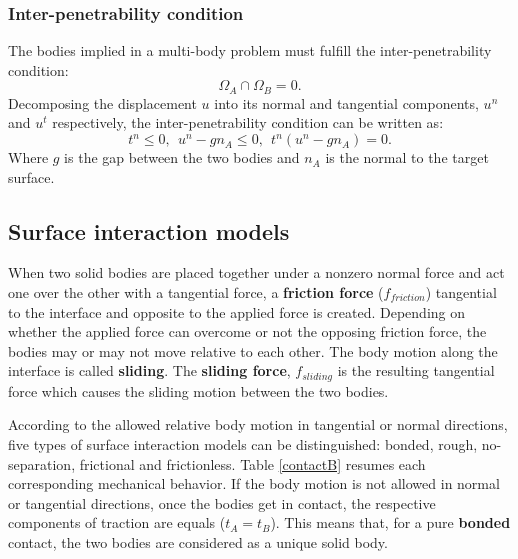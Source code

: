  \subsubsection*{Inter-penetrability condition}
The bodies implied in a multi-body problem must fulfill the inter-penetrability condition:
\begin{equation}
\Omega_A \cap \Omega_B = 0.
\end{equation}
Decomposing the displacement $u$ into its normal and tangential components, $u^n$ and $u^t$ respectively, the inter-penetrability condition can be written as:
\begin{equation}
t^n \leq 0, \ \ u^n-g n_A \leq 0, \ \ t^n(u^n-g n_A) = 0.
\end{equation}
 Where $g$ is the gap between the two bodies and $n_A$ is the normal to the target surface.

\subsection{Surface interaction models}%

\label{subsection:surfaceinteractionmodels}
When two solid bodies are placed together under a nonzero normal force and act one over the other with a tangential force, a \textbf{friction force} ($f_{friction}$) tangential to the interface and opposite to the applied force is created. Depending on whether the applied force can overcome  or not the opposing friction force, the bodies may or may not move relative to each other. The body motion along the interface is called \textbf{sliding}. The \textbf{sliding force}, $f_{sliding}$ is the resulting tangential force which causes the sliding motion between the two bodies.
  
According to the allowed relative body motion in tangential or normal directions, five types of surface interaction models can be distinguished: bonded, rough, no-separation, frictional and frictionless. Table \ref{contactB} resumes each corresponding mechanical behavior. If the body motion is not allowed in normal or tangential directions, once the bodies get in contact, the respective components of traction are equals ($t_A=t_B$). This means that, for a pure \textbf{bonded} contact, the two bodies are considered as a unique solid body.    

